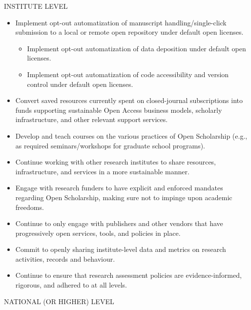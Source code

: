 \documentclass[]{article}
\begin{document}
INSTITUTE LEVEL

\begin{itemize}
\item
  Implement opt-out automatization of manuscript handling/single-click
  submission to a local or remote open repository under default open
  licenses.

  \begin{itemize}
  \item
    Implement opt-out automatization of data deposition under default
    open licenses.
  \item
    Implement opt-out automatization of code accessibility and version
    control under default open licenses.
  \end{itemize}
\item
  Convert saved resources currently spent on closed-journal
  subscriptions into funds supporting sustainable Open Access business
  models, scholarly infrastructure, and other relevant support services.
\item
  Develop and teach courses on the various practices of Open Scholarship
  (e.g., as required seminars/workshops for graduate school programs).
\item
  Continue working with other research institutes to share resources,
  infrastructure, and services in a more sustainable manner.
\item
  Engage with research funders to have explicit and enforced mandates
  regarding Open Scholarship, making sure not to impinge upon academic
  freedoms.
\item
  Continue to only engage with publishers and other vendors that have
  progressively open services, tools, and policies in place.
\item
  Commit to openly sharing institute-level data and metrics on research
  activities, records and behaviour.
\item
  Continue to ensure that research assessment policies are
  evidence-informed, rigorous, and adhered to at all levels.
\end{itemize}

NATIONAL (OR HIGHER) LEVEL
\end{document}
